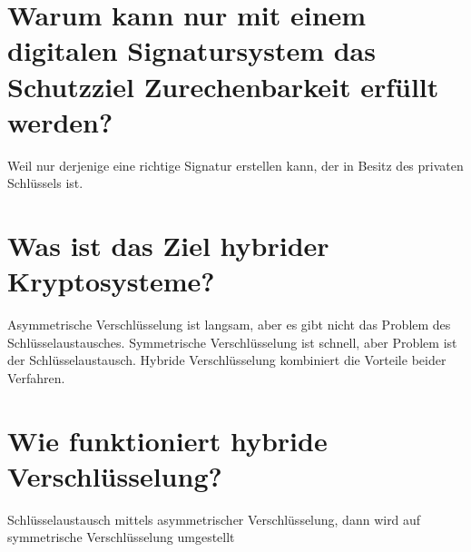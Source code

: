 \documentclass{article}
\begin{document}
	\section*{Warum kann nur mit einem digitalen Signatursystem das Schutzziel Zurechenbarkeit erfüllt werden?}
	Weil nur derjenige eine richtige Signatur erstellen kann, der in Besitz des privaten Schlüssels ist.
	
	\section*{Was ist das Ziel hybrider Kryptosysteme?}
	Asymmetrische Verschlüsselung ist langsam, aber es gibt nicht das Problem des Schlüsselaustausches. Symmetrische Verschlüsselung ist schnell, aber Problem ist der Schlüsselaustausch. Hybride Verschlüsselung kombiniert die Vorteile beider Verfahren.
	
	\section*{Wie funktioniert hybride Verschlüsselung?}
	Schlüsselaustausch mittels asymmetrischer Verschlüsselung, dann wird auf symmetrische Verschlüsselung umgestellt
\end{document}
